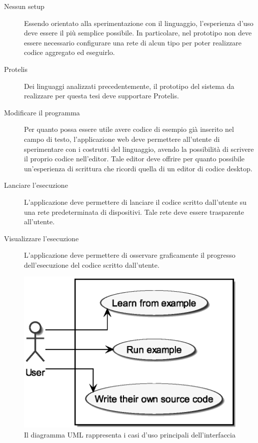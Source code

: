       \begin{description}
        \item[Nessun setup]
          Essendo orientato alla sperimentazione con il linguaggio, l'esperienza d'uso deve essere il più semplice possibile.
          In particolare, nel prototipo non deve essere necessario configurare una rete di alcun tipo per poter realizzare codice aggregato ed eseguirlo.

        \item[Protelis]
          Dei linguaggi analizzati precedentemente, il prototipo del sistema da realizzare per questa tesi deve supportare Protelis.

        \item[Modificare il programma]
          Per quanto possa essere utile avere codice di esempio già inserito nel campo di testo, l'applicazione web deve permettere all'utente di sperimentare con i costrutti del linguaggio, avendo la possibilità di scrivere il proprio codice nell'editor.
          Tale editor deve offrire per quanto possibile un'esperienza di scrittura che ricordi quella di un editor di codice desktop.

        \item[Lanciare l'esecuzione]
          L'applicazione deve permettere di lanciare il codice scritto dall'utente su una rete predeterminata di dispositivi.
          Tale rete deve essere trasparente all'utente.

        \item[Visualizzare l'esecuzione]
          L'applicazione deve permettere di osservare graficamente il progresso dell'esecuzione del codice scritto dall'utente.

      \end{description}

      \begin{figure}[htbp]
        \centering
        \includegraphics[width=.6\textwidth]{res/uml/use-cases-frontend.eps}%
        \caption{Il diagramma UML rappresenta i casi d'uso principali dell'interfaccia}%
        \label{fig:uml-use-case}
      \end{figure}

